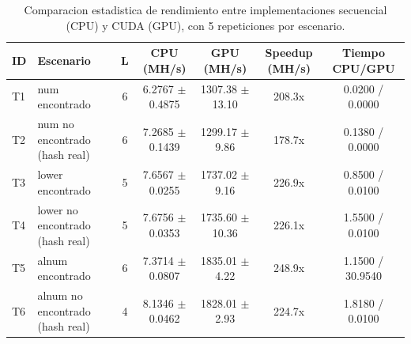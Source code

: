 \begin{table}[h]
\centering
\small
\begin{tabular}{l l c c c c c}
\hline
ID & Escenario & L & CPU (MH/s) & GPU (MH/s) & Speedup (MH/s) & Tiempo CPU/GPU \\
\hline
T1 & num encontrado & 6 & 6.2767 $\pm$ 0.4875 & 1307.38 $\pm$ 13.10 & 208.3x & 0.0200 / 0.0000 \\
T2 & num no encontrado (hash real) & 6 & 7.2685 $\pm$ 0.1439 & 1299.17 $\pm$ 9.86 & 178.7x & 0.1380 / 0.0000 \\
T3 & lower encontrado & 5 & 7.6567 $\pm$ 0.0255 & 1737.02 $\pm$ 9.16 & 226.9x & 0.8500 / 0.0100 \\
T4 & lower no encontrado (hash real) & 5 & 7.6756 $\pm$ 0.0353 & 1735.60 $\pm$ 10.36 & 226.1x & 1.5500 / 0.0100 \\
T5 & alnum encontrado & 6 & 7.3714 $\pm$ 0.0807 & 1835.01 $\pm$ 4.22 & 248.9x & 1.1500 / 30.9540 \\
T6 & alnum no encontrado (hash real) & 4 & 8.1346 $\pm$ 0.0462 & 1828.01 $\pm$ 2.93 & 224.7x & 1.8180 / 0.0100 \\
\hline
\end{tabular}
\caption{Comparacion estadistica de rendimiento entre implementaciones secuencial (CPU) y CUDA (GPU), con 5 repeticiones por escenario.}
\label{tab:comparacion_cpu_gpu_md5_stats}
\end{table}

